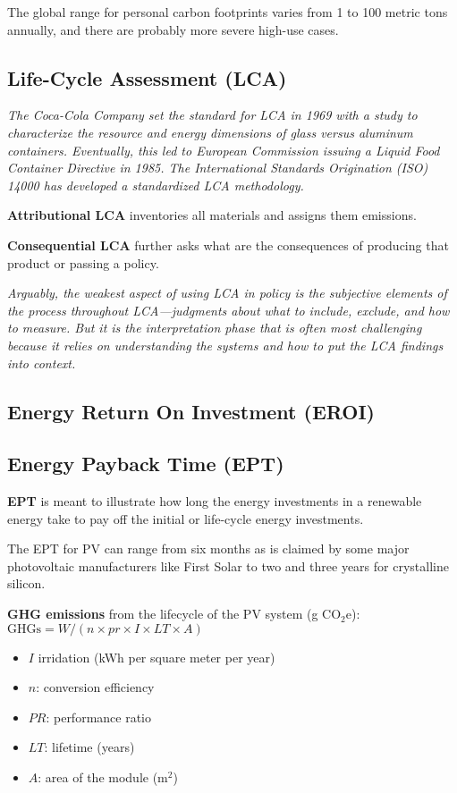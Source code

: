The global range for personal carbon footprints varies from 1 to 100 metric
tons annually, and there are probably more severe high-use cases.

\subsection{Life-Cycle Assessment (LCA)}

\textit{
The Coca-Cola Company
set the standard for LCA in 1969 with a study to characterize the resource and
energy dimensions of glass versus aluminum containers. Eventually, this led to
European Commission issuing a Liquid Food Container Directive in 1985. The
International Standards Origination (ISO) 14000 has developed a standardized
LCA methodology.
}

\textbf{Attributional LCA} inventories all materials and assigns them
emissions.

\textbf{Consequential LCA} further asks what are the consequences of producing
that product or passing a policy.

\textit{
Arguably, the weakest aspect of using LCA in policy is the subjective elements
of the process throughout LCA—judgments about what to include, exclude, and
how to measure. But it is the interpretation phase that is often most
challenging because it relies on understanding the systems and how to put the
LCA findings into context.
}

\subsection{Energy Return On Investment (EROI)}

\subsection{Energy Payback Time (EPT)}

\textbf{EPT} is meant to illustrate how long the energy investments in a
renewable energy take to pay off the initial or life-cycle energy
investments.

The EPT for PV can range from six months as is claimed by some major
photovoltaic manufacturers like First Solar to two and three years for
crystalline silicon.

\textbf{GHG emissions} from the lifecycle of the PV system (g CO$_2$e):
$\text{GHGs} = W/(n \times pr \times I \times LT \times A)$
\begin{itemize}
	\item $I$ irridation (kWh per square meter per year)
	\item $n$: conversion efficiency
	\item $PR$: performance ratio
	\item $LT$: lifetime (years)
	\item $A$: area of the module (m$^2$)
\end{itemize}

